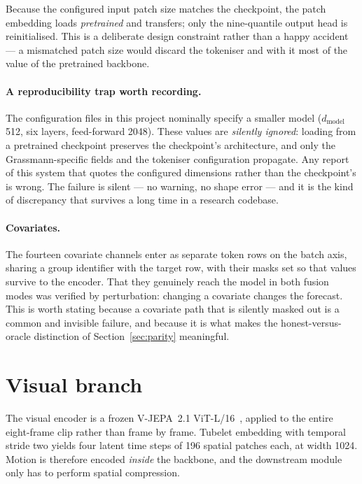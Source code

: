 Because the configured input patch size matches the checkpoint, the patch embedding loads
\emph{pretrained} and transfers; only the nine-quantile output head is reinitialised. This is
a deliberate design constraint rather than a happy accident --- a mismatched patch size would
discard the tokeniser and with it most of the value of the pretrained backbone.

\paragraph{A reproducibility trap worth recording.} The configuration files in this project
nominally specify a smaller model ($d_{\text{model}}$ 512, six layers, feed-forward 2048).
These values are \emph{silently ignored}: loading from a pretrained checkpoint preserves the
checkpoint's architecture, and only the Grassmann-specific fields and the tokeniser
configuration propagate. Any report of this system that quotes the configured dimensions
rather than the checkpoint's is wrong. The failure is silent --- no warning, no shape error
--- and it is the kind of discrepancy that survives a long time in a research codebase.

\paragraph{Covariates.} The fourteen covariate channels enter as separate token rows on the
batch axis, sharing a group identifier with the target row, with their masks set so that
values survive to the encoder. That they genuinely reach the model in both fusion modes was
verified by perturbation: changing a covariate changes the forecast. This is worth
stating because a covariate path that is silently masked out is a common and invisible
failure, and because it is what makes the honest-versus-oracle distinction of
Section~\ref{sec:parity} meaningful.

\section{Visual branch}
\label{sec:visual-branch}

The visual encoder is a frozen V-JEPA~2.1 ViT-L/16~\cite{vjepa2}, applied to the entire
eight-frame clip rather than frame by frame. Tubelet embedding with temporal stride two
yields four latent time steps of 196 spatial patches each, at width 1024. Motion is therefore
encoded \emph{inside} the backbone, and the downstream module only has to perform spatial
compression.

